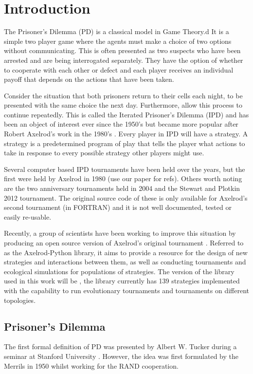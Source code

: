 
\chapter{Introduction}\label{cha:introduction}

The Prisoner's Dilemma (PD) is a classical model in Game Theory.d
It is a simple two player game where the agents must make a choice of two options without communicating.
This is often presented as two suspects who have been arrested and are being interrogated separately.
They have the option of whether to cooperate with each other or defect and each player receives an individual payoff that depends on the actions that have been taken.

Consider the situation that both prisoners return to their cells each night, to be presented with the same choice the next day.
Furthermore, allow this process to continue repeatedly.
This is called the Iterated Prisoner's Dilemma (IPD) and has been an object of interest ever since the 1950's but became more popular after Robert Axelrod's work in the 1980's \cite{Axelrod1980a}.
Every player in IPD will have a strategy.
A strategy is a predetermined program of play that tells the player what actions to take in response to every possible strategy other players might use.

Several computer based IPD tournaments have been held over the years, but the first were held by Axelrod in 1980 (use our paper for refs). %
Others worth noting are the two anniversary tournaments  held in 2004 and the Stewart and Plotkin 2012 tournament.
The original source code of these is only available for Axelrod's second tournament (in FORTRAN) and it is not well documented, tested or easily re-usable.

Recently, a group of scientists have been working to improve this situation by producing an open source version of Axelrod's original tournament \cite{Knight2016}.
Referred to as the Axelrod-Python library, it aims to provide a resource for the design of new strategies and interactions between them, as well as conducting tournaments and ecological simulations for populations of strategies.
The version of the library used in this work will be \cite{axelrodproject}, the library currently has 139 strategies implemented with the capability to run evolutionary tournaments and tournaments on different topologies.

\section{Prisoner's Dilemma}\label{sec:intro_pd}
The first formal definition of PD was presented by Albert W. Tucker during a seminar at Stanford University \cite{Gass2005}.
However, the idea was first formulated by the Merrils \cite{Flood1958} in 1950 whilst working for the RAND cooperation.

